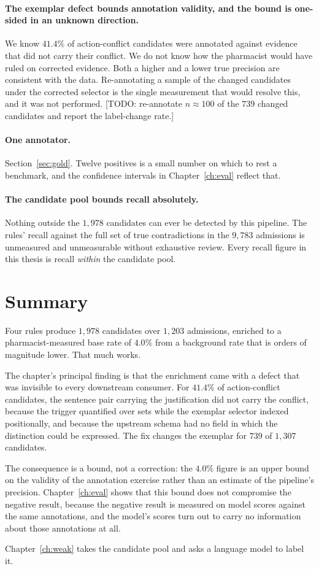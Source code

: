 \paragraph{The exemplar defect bounds annotation validity, and the bound is
one-sided in an unknown direction.} We know $41.4\%$ of action-conflict
candidates were annotated against evidence that did not carry their conflict. We
do not know how the pharmacist would have ruled on corrected evidence. Both a
higher and a lower true precision are consistent with the data. Re-annotating a
sample of the changed candidates under the corrected selector is the single
measurement that would resolve this, and it was not performed. [TODO: re-annotate
$n \approx 100$ of the $739$ changed candidates and report the label-change
rate.]

\paragraph{One annotator.} Section~\ref{sec:gold}. Twelve positives is a small
number on which to rest a benchmark, and the confidence intervals in
Chapter~\ref{ch:eval} reflect that.

\paragraph{The candidate pool bounds recall absolutely.} Nothing outside the
$1{,}978$ candidates can ever be detected by this pipeline. The rules' recall
against the full set of true contradictions in the $9{,}783$ admissions is
unmeasured and unmeasurable without exhaustive review. Every recall figure in
this thesis is recall \emph{within} the candidate pool.

\section{Summary}
\label{sec:cand-summary}

Four rules produce $1{,}978$ candidates over $1{,}203$ admissions, enriched to a
pharmacist-measured base rate of $4.0\%$ from a background rate that is orders
of magnitude lower. That much works.

The chapter's principal finding is that the enrichment came with a defect that
was invisible to every downstream consumer. For $41.4\%$ of action-conflict
candidates, the sentence pair carrying the justification did not carry the
conflict, because the trigger quantified over sets while the exemplar selector
indexed positionally, and because the upstream schema had no field in which the
distinction could be expressed. The fix changes the exemplar for $739$ of
$1{,}307$ candidates.

The consequence is a bound, not a correction: the $4.0\%$ figure is an upper
bound on the validity of the annotation exercise rather than an estimate of the
pipeline's precision. Chapter~\ref{ch:eval} shows that this bound does not
compromise the negative result, because the negative result is measured on
model scores against the same annotations, and the model's scores turn out to
carry no information about those annotations at all.

Chapter~\ref{ch:weak} takes the candidate pool and asks a language model to
label it.
